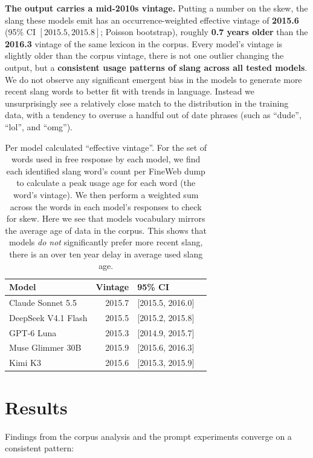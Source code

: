\documentclass[11pt]{article}
\begin{document}
\textbf{The output carries a mid-2010s vintage.} Putting a number on the skew, the slang these models emit has an occurrence-weighted effective vintage of \textbf{2015.6} (95\% CI $[2015.5, 2015.8]$; Poisson bootstrap), roughly \textbf{0.7 years older} than the \textbf{2016.3} vintage of the same lexicon in the corpus. Every model's vintage is slightly older than the corpus vintage, there is not one outlier changing the output, but a \textbf{consistent usage patterns of slang across all tested models}. We do not observe any significant emergent bias in the models to generate more recent slang words to better fit with trends in language. Instead we unsurprisingly see a relatively close match to the distribution in the training data, with a tendency to overuse a handful out of date phrases (such as ``dude'', ``lol'', and ``omg'').

\begin{table}[htbp]
\centering
\small
\begin{tabular}{lr@{\hskip 2em}lr}
\toprule
Model & Vintage & 95\% CI \\
\midrule
Claude Sonnet 5.5 & 2015.7 & [2015.5, 2016.0] \\
DeepSeek V4.1 Flash & 2015.5 & [2015.2, 2015.8] \\
GPT-6 Luna & 2015.3 & [2014.9, 2015.7] \\
Muse Glimmer 30B & 2015.9 & [2015.6, 2016.3]  \\
Kimi K3 & 2015.6 & [2015.3, 2015.9] \\
\bottomrule
\end{tabular}
\caption{Per model calculated ``effective vintage''. For the set of words used in free response by each model, we find each identified slang word's count per FineWeb dump to calculate a peak usage age for each word (the word's vintage). We then perform a weighted sum across the words in each model's responses to check for skew. Here we see that models vocabulary mirrors the average age of data in the corpus. This shows that models \textit{do not} significantly prefer more recent slang, there is an over ten year delay in average used slang age.}%
\label{tab:modelvintage}
\end{table}

\section{Results}

Findings from the corpus analysis and the prompt experiments converge on a consistent pattern:
\end{document}
